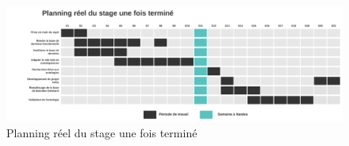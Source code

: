 \begin{figure} [H]
    \centering
    \includegraphics[width=1\textwidth]{assets/planning/planning_fin.png}
    \caption{Planning réel du stage une fois terminé}
    \label{fig:planningFin}
\end{figure}

